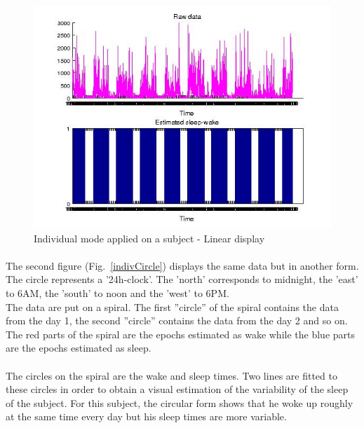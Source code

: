 \documentclass[a4paper,12pt]{article}
\begin{document}
\begin{figure}[H]
\centering
\includegraphics[scale=0.75]{Images/indivResultsLinear.jpg}
\caption{Individual mode applied on a subject - Linear display}
\label{indivLinear}
\end{figure}

\paragraph{}
The second figure (Fig.~\ref{indivCircle}) displays the same data but in another form. The circle represents a '24h-clock'. The 'north' corresponds to midnight, the 'east' to 6AM, the 'south' to noon and the 'west' to 6PM. \\
The data are put on a spiral. The first ''circle'' of the spiral contains the data from the day 1, the second ''circle'' contains the data from the day 2 and so on. The red parts of the spiral are the epochs estimated as wake while the blue parts are the epochs estimated as sleep.

\paragraph{}
The circles on the spiral are the wake and sleep times. Two lines are fitted to these circles in order to obtain a visual estimation of the variability of the sleep of the subject. For this subject, the circular form shows that he woke up roughly at the same time every day but his sleep times are more variable.
\end{document}
